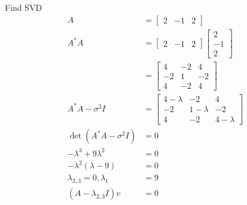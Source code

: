 \documentclass[12pt, letterpaper]{article}
\begin{document}
Find SVD
\begin{align*}
    A &= \begin{bmatrix} 2 & -1 & 2 \end{bmatrix} \\
    A^*A &= \begin{bmatrix} 2 & -1 & 2 \end{bmatrix}\begin{bmatrix} 2 \\ -1 \\ 2 \end{bmatrix} \\
    &= \begin{bmatrix} 4 & -2 & 4 \\ -2 & 1 & -2 \\ 4 & -2 & 4 \end{bmatrix} \\
    A^*A - \sigma^2 I &= \begin{bmatrix} 4 - \lambda & -2 & 4 \\ -2 & 1 - \lambda & -2 \\ 4 & -2 & 4 - \lambda \end{bmatrix} \\
    \det(A^*A - \sigma^2 I) &= 0 \\
    -\lambda^3 + 9 \lambda^2 &= 0 \\
    -\lambda^2(\lambda - 9) &= 0 \\
    \lambda_{2,3} = 0, \lambda_1 &= 9 \\
    (A - \lambda_{2,3} I) v &= 0
\end{align*}
\end{document}

